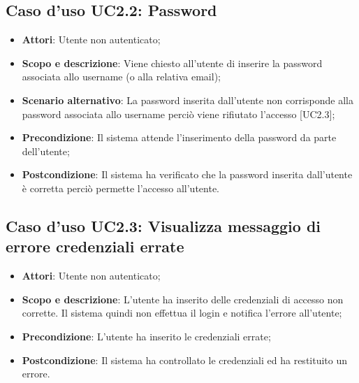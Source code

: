 \documentclass[12pt,a4paper,titlepage]{article}
\begin{document}
	\subsection{Caso d'uso UC2.2: Password}
	\label{UC2.2}
	\begin{itemize}
		\item \textbf{Attori}: Utente non autenticato;
		\item \textbf{Scopo e descrizione}: Viene chiesto all'utente di inserire la password associata allo username (o alla relativa email);
		\item \textbf{Scenario alternativo}: La password inserita dall'utente non corrisponde alla password associata allo username perciò viene rifiutato l'accesso [UC2.3];
		\item \textbf{Precondizione}: Il sistema attende l'inserimento della password da parte dell'utente;
		\item \textbf{Postcondizione}: Il sistema ha verificato che la password inserita dall'utente è corretta perciò permette l'accesso all'utente.
	\end{itemize}
	\subsection{Caso d'uso UC2.3: Visualizza messaggio di errore credenziali errate}
	\label{UC2.3}
	\begin{itemize}
		\item \textbf{Attori}: Utente non autenticato;
		\item \textbf{Scopo e descrizione}: L'utente ha inserito delle credenziali di accesso non corrette. Il sistema quindi non effettua il login e notifica l'errore all'utente;
		\item \textbf{Precondizione}: L'utente ha inserito le credenziali errate;
		\item \textbf{Postcondizione}: Il sistema ha controllato le credenziali ed ha restituito un errore.
	\end{itemize}
\end{document}
